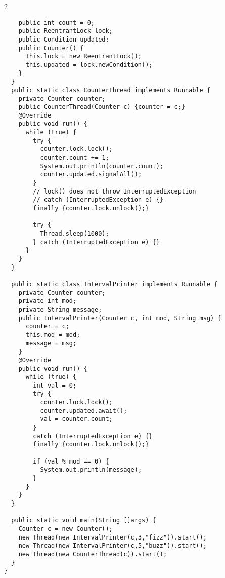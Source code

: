 \documentclass{article}
\def \columncount {2}
\begin{document}
\begin{multicols}{\columncount}
\begin{outline}[longenum]
\begin{verbatim}
    public int count = 0;
    public ReentrantLock lock;
    public Condition updated;
    public Counter() {
      this.lock = new ReentrantLock();
      this.updated = lock.newCondition();
    }
  }
  public static class CounterThread implements Runnable {
    private Counter counter;
    public CounterThread(Counter c) {counter = c;}
    @Override
    public void run() {
      while (true) {
        try {
          counter.lock.lock();
          counter.count += 1;
          System.out.println(counter.count);
          counter.updated.signalAll();
        } 
        // lock() does not throw InterruptedException
        // catch (InterruptedException e) {}
        finally {counter.lock.unlock();}
        
        try {
          Thread.sleep(1000);
        } catch (InterruptedException e) {}
      }
    }
  }

  public static class IntervalPrinter implements Runnable {
    private Counter counter;
    private int mod;
    private String message;
    public IntervalPrinter(Counter c, int mod, String msg) {
      counter = c;
      this.mod = mod;
      message = msg;
    }
    @Override
    public void run() {
      while (true) {
        int val = 0;
        try {
          counter.lock.lock();
          counter.updated.await();
          val = counter.count;
        } 
        catch (InterruptedException e) {}
        finally {counter.lock.unlock();}

        if (val % mod == 0) {
          System.out.println(message);
        }
      }
    }
  }

  public static void main(String []args) {
    Counter c = new Counter();
    new Thread(new IntervalPrinter(c,3,"fizz")).start();
    new Thread(new IntervalPrinter(c,5,"buzz")).start();
    new Thread(new CounterThread(c)).start();
  }
}
\end{verbatim}




\end{outline}
\end{multicols}
\end{document}
